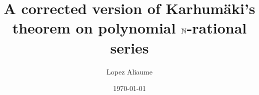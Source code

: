 \title{A corrected version of Karhumäki’s theorem
       on polynomial $\mathbb{N}$-rational series}
\author{
    Lopez Aliaume
}
\date{\today}


\newcommand{\acknowledge}{
    I would like to thank Gaëtan Douéneau-Tabot
    for mentionning this problem, checking 
    my counter-example, and supporting me in publishing
    this paper.
}

\newcommand{\makeabstract}{
    \begin{abstract}
        We propose a short counter-example to a
        previous result on commutative $\Nat$-rational series
        by Karhumäki, and provide a proof for
        the corrected statement.
        This opens the way to the decidability of
        $\Nat$ polyregular functions 
        among $\Rel$ porylegular functions, which is
        an ongoing research.
    \end{abstract}
}
